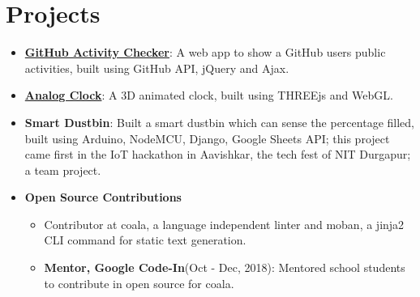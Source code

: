 \documentclass[letterpaper,11pt]{article}
\begin{document}
\section{Projects}
      \setlength{\itemsep}{0.5pt}
      \begin{itemize}
        \item\textbf{\href{https://github.com/ayan-b/GitHub-Activity-Checker}{GitHub Activity Checker}}{: A web app to show a GitHub user\textsc{}s public activities, built using GitHub API, jQuery and Ajax.}\\
        \item\textbf{\href{https://github.com/ayan-b/Analog-Clock-Reading}{Analog Clock}}{: A 3D animated clock, built using THREEjs and WebGL.}\\
        \item\textbf{Smart Dustbin}{: Built a smart dustbin which can sense the percentage filled, built using Arduino, NodeMCU, Django, Google Sheets API; this project came first in the IoT hackathon in Aavishkar, the tech
        fest of NIT Durgapur; a team project.}\\
        \item\textbf{Open Source Contributions}
        \begin{itemize}
            \item{Contributor at coala, a language independent linter and moban, a jinja2 CLI command for static text generation.}\\
            \item\textbf{Mentor, Google Code-In}{(Oct - Dec, 2018)}{: Mentored school students to contribute in open source for coala.}
         \end{itemize}   
      \end{itemize}
  
\end{document}
